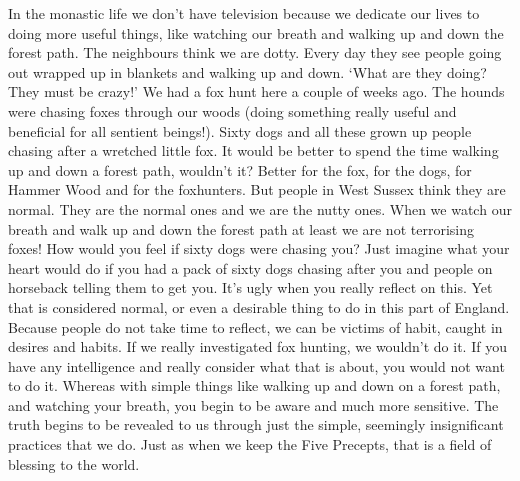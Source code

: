In the monastic life we don't have television because we dedicate our lives to doing more useful things, like watching our breath and walking up and down the forest path. The neighbours think we are dotty. Every day they see people going out wrapped up in blankets and walking up and down. `What are they doing? They must be crazy!' We had a fox hunt here a couple of weeks ago. The hounds were chasing foxes through our woods (doing something really useful and beneficial for all sentient beings!). Sixty dogs and all these grown up people chasing after a wretched little fox. It would be better to spend the time walking up and down a forest path, wouldn't it? Better for the fox, for the dogs, for Hammer Wood and for the foxhunters. But people in West Sussex think they are normal. They are the normal ones and we are the nutty ones. When we watch our breath and walk up and down the forest path at least we are not terrorising foxes! How would you feel if sixty dogs were chasing you? Just imagine what your heart would do if you had a pack of sixty dogs chasing after you and people on horseback telling them to get you. It's ugly when you really reflect on this. Yet that is considered normal, or even a desirable thing to do in this part of England. Because people do not take time to reflect, we can be victims of habit, caught in desires and habits. If we really investigated fox hunting, we wouldn't do it. If you have any intelligence and really consider what that is about, you would not want to do it. Whereas with simple things like walking up and down on a forest path, and watching your breath, you begin to be aware and much more sensitive. The truth begins to be revealed to us through just the simple, seemingly insignificant practices that we do. Just as when we keep the Five Precepts, that is a field of blessing to the world.

